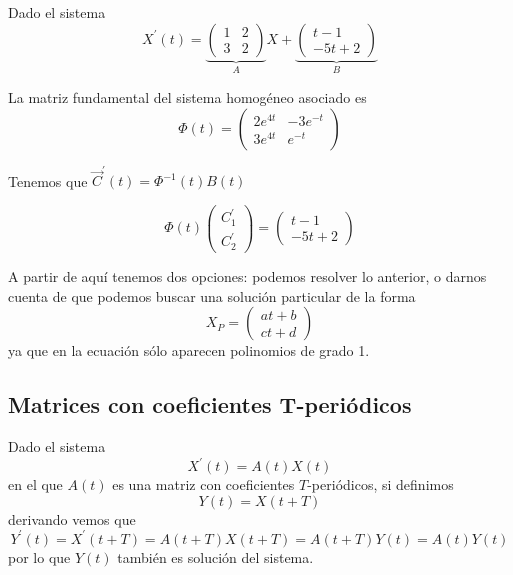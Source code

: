 \documentclass{mathnotes}
\begin{document}
\begin{example}
Dado el sistema $$X^\prime(t) = \underbrace{\begin{pmatrix}
1 & 2 \\ 3 & 2
\end{pmatrix}}_AX + \underbrace{\begin{pmatrix}
t-1\\-5t+2
\end{pmatrix}}_B$$

La matriz fundamental del sistema homogéneo asociado es $$\Phi(t) = \begin{pmatrix}
2e^{4t} & -3e^{-t}\\ 3e^{4t} & e^{-t}
\end{pmatrix}$$

Tenemos que $\vec{C}^\prime(t) = \Phi^{-1}(t)B(t)$

$$\Phi(t)\begin{pmatrix}
C_1^\prime\\C_2^\prime
\end{pmatrix} = \begin{pmatrix}
t-1\\-5t+2
\end{pmatrix}$$

A partir de aquí tenemos dos opciones: podemos resolver lo anterior, o darnos cuenta de que podemos buscar una solución particular de la forma 
$$X_P = \begin{pmatrix}
at+b\\ct+d
\end{pmatrix}$$ ya que en la ecuación sólo aparecen polinomios de grado 1.
\end{example}

\subsection{Matrices con coeficientes T-periódicos}
Dado el sistema $$X^\prime(t) = A(t)X(t)$$ en el que $A(t)$ es una matriz con coeficientes $T$-periódicos, si definimos $$Y(t) = X(t+T)$$ derivando vemos que
$$Y^\prime(t) = X^\prime(t+T) = A(t+T) X(t+T) = A(t+T)Y(t) = A(t)Y(t) $$ por lo que $Y(t)$ también es solución del sistema.
\end{document}
